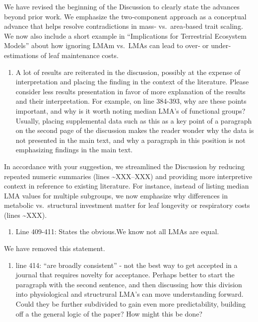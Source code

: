 \documentclass[
  12pt,
  letterpaper,
  DIV=11,
  numbers=noendperiod]{scrartcl}
\providecommand{\tightlist}{%
  \setlength{\itemsep}{0pt}\setlength{\parskip}{0pt}}\usepackage{longtable,booktabs,array}
\renewenvironment{quote}
  {\begin{customblockquote}\color{blockquote-text}\ignorespaces}
  {\end{customblockquote}}
\begin{document}
We have revised the beginning of the Discussion to clearly state the
advances beyond prior work. We emphasize the two‐component approach as a
conceptual advance that helps resolve contradictions in mass‐
vs.~area‐based trait scaling. We now also include a short example in
``Implications for Terrestrial Ecosystem Models'' about how ignoring
LMAm vs.~LMAs can lead to over‐ or under‐estimations of leaf maintenance
costs.

\begin{quote}
\begin{enumerate}
\def\labelenumi{\arabic{enumi})}
\setcounter{enumi}{1}
\tightlist
\item
  A lot of results are reiterated in the discussion, possibly at the
  expense of interpretation and placing the finding in the context of
  the literature. Please consider less results presentation in favor of
  more explanation of the results and their interpretation. For example,
  on line 384-393, why are these points important, and why is it worth
  noting median LMA's of functional groups? Usually, placing
  supplemental data such as this as a key point of a paragraph on the
  second page of the discussion makes the reader wonder why the data is
  not presented in the main text, and why a paragraph in this position
  is not emphasizing findings in the main text.
\end{enumerate}
\end{quote}

In accordance with your suggestion, we streamlined the Discussion by
reducing repeated numeric summaries (lines \textasciitilde XXX--XXX) and
providing more interpretive context in reference to existing literature.
For instance, instead of listing median LMA values for multiple
subgroups, we now emphasize why differences in metabolic vs.~structural
investment matter for leaf longevity or respiratory costs (lines
\textasciitilde XXX).

\begin{quote}
\begin{enumerate}
\def\labelenumi{\arabic{enumi})}
\setcounter{enumi}{2}
\tightlist
\item
  Line 409-411: States the obvious.We know not all LMAs are equal.
\end{enumerate}
\end{quote}

We have removed this statement.

\begin{quote}
\begin{enumerate}
\def\labelenumi{\arabic{enumi})}
\setcounter{enumi}{3}
\tightlist
\item
  line 414: ``are broadly consistent'' - not the best way to get
  accepted in a journal that requires novelty for acceptance. Perhaps
  better to start the paragraph with the second sentence, and then
  discussing how this division into physiological and structrural LMA's
  can move understanding forward. Could they be further subdivided to
  gain even more predictability, building off a the general logic of the
  paper? How might this be done?
\end{enumerate}
\end{quote}
\end{document}
